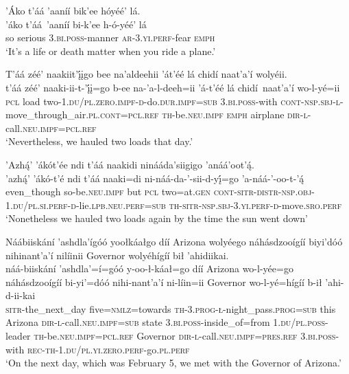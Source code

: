 \ea\label{ex:text9-4-14}
’Áko t’áá ’aaníí bik’ee hóyéé’ lá.\\
\gll ’áko	t’áá~{’aaníí}	bi-k’ee	h-ó-yéé’	lá\\
     so	serious	3.\textsc{bi}.\textsc{poss}-manner	\textsc{ar}-3.\textsc{yi}.\textsc{perf}-fear	\textsc{emph}\\
\glt `It's a life or death matter when you ride a plane.'
\z

\ea\label{ex:text9-4-15}
T’áá zéé’ naakiit’į́įgo bee na’aldeehii ’át’éé lá chidí naat’a’í wolyéii.\\
\gll t’áá	zéé’	naaki-ii-t-’į́į=go	b-ee	na-’a-l-deeh=ii	’á-t’éé	lá	chidí~{naat’a’í}	wo-l-yé=ii\\
     \textsc{pcl}	load	two-1.\textsc{du}/\textsc{pl}.\textsc{zero}.\textsc{impf}-\textsc{d}-do.\textsc{dur}.\textsc{impf}=\textsc{sub}	3.\textsc{bi}.\textsc{poss}-with	\textsc{cont}-\textsc{nsp}.\textsc{sbj}-\textsc{l}-move\_through\_air.\textsc{pl}.\textsc{cont}=\textsc{pcl}.\textsc{ref}	\textsc{th}-be.\textsc{neu}.\textsc{impf}	\textsc{emph}	airplane	\textsc{dir}-\textsc{l}-call.\textsc{neu}.\textsc{impf}=\textsc{pcl}.\textsc{ref}\\
\glt `Nevertheless, we hauled two loads that day.'
\z

\ea\label{ex:text9-4-16}
’Azhą́’ ’ákót’ée ndi t’áá naakidi ninááda’siigigo ’anáá’oot’ą́.\\
\gll ’azhą́’	’ákó-t’é	ndi	t’áá	naaki=di	ni-náá-da-’-sii-d-yį́=go	’a-náá-’-oo-t-’ą́\\
     even\_though	so-be.\textsc{neu}.\textsc{impf}	but	\textsc{pcl}	two=at.\textsc{gen}	\textsc{cont}-\textsc{sitr}-\textsc{distr}-\textsc{nsp}.\textsc{obj}-1.\textsc{du}/\textsc{pl}.\textsc{si}.\textsc{perf}-\textsc{d}-lie.\textsc{lpb}.\textsc{neu}.\textsc{perf}=\textsc{sub}	\textsc{th}-\textsc{sitr}-\textsc{nsp}.\textsc{sbj}-3.\textsc{yi}.\textsc{perf}-\textsc{d}-move.\textsc{sro}.\textsc{perf}\\
\glt `Nonetheless we hauled two loads again by the time the sun went down'
\z

\ea\label{ex:text9-5-1}
Náábiiskání ’ashdla’ígóó yoołkáałgo díí Arizona wolyéego náhásdzooígíí biyi’dóó nihinant’a’í nilíinii Governor wolyéhígíí bił ’ahidiikai.\\
\gll náá-biiskání	’ashdla’=í=góó	y-oo-ł-káał=go	díí	Arizona	wo-l-yée=go	náhásdzooígíí	bi-yi’=dóó	nihi-nant’a’í	ni-líin=ii	Governor	wo-l-yé=hígíí	b-ił	’ahi-d-ii-kai\\
     \textsc{sitr}-the\_next\_day	five=\textsc{nmlz}=towards	\textsc{th}-3.\textsc{prog}-\textsc{ł}-night\_pass.\textsc{prog}=\textsc{sub}	this	Arizona	\textsc{dir}-\textsc{l}-call.\textsc{neu}.\textsc{impf}=\textsc{sub}	state	3.\textsc{bi}.\textsc{poss}-inside\_of=from	1.\textsc{du}/\textsc{pl}.\textsc{poss}-leader	\textsc{th}-be.\textsc{neu}.\textsc{impf}=\textsc{pcl}.\textsc{ref}	Governor	\textsc{dir}-\textsc{l}-call.\textsc{neu}.\textsc{impf}=\textsc{pres}.\textsc{ref}	3.\textsc{bi}.\textsc{poss}-with	\textsc{rec}-\textsc{th}-1.\textsc{du}/\textsc{pl}.\textsc{yi}.\textsc{zero}.\textsc{perf}-go.\textsc{pl}.\textsc{perf}\\
\glt `On the next day, which was February 5, we met with the Governor of Arizona.'
\z

